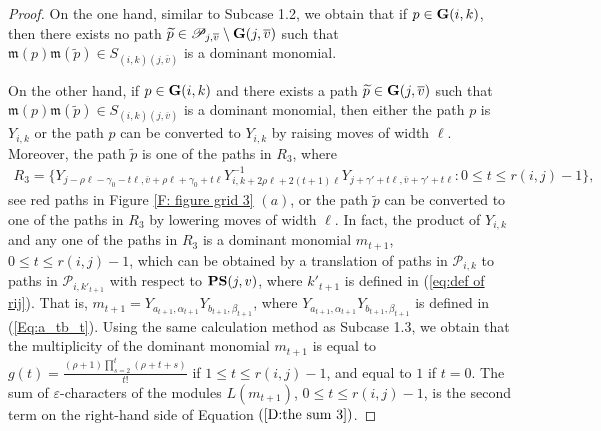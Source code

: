 \documentclass[12pt, reqno]{amsart}
\numberwithin{equation}{section}
\begin{document}
{\begin{proof}
On the one hand, similar to Subcase 1.2, we obtain that if $p \in {\bf G}(i,k)$, then there exists no path $\widetilde{p}\in \mathscr{P}_{j, \overline{v}}\setminus{\bf G}(j,\overline{v})$ such that $\mathfrak{m}(p)\mathfrak{m}(\widetilde{p}) \in S_{(i, k)(j, \overline{v})}$ is a dominant monomial.

On the other hand, if $p \in {\bf G}(i,k)$ and there exists a path $\widetilde{p}\in {\bf G}(j,\overline{v})$ such that $\mathfrak{m}(p)\mathfrak{m}(\widetilde{p})\in S_{(i, k)(j, \overline{v})}$ is a dominant monomial, then either the path $p$ is $Y_{i,k}$ or the path $p$ can be converted to $Y_{i,k}$ by raising moves of width $\ell$. Moreover, the path $\widetilde{p}$ is one of the paths in $R_3$, where
\begin{align*}
R_3=\{Y_{j-\rho \ell-\gamma_0-t \ell,\overline{v}+\rho \ell+\gamma_0+t \ell}Y_{i,k+2\rho \ell+2(t+1) \ell}^{-1}Y_{j+\gamma'+t \ell,\overline{v}+\gamma'+t \ell}: 0\leq t\leq r(i,j)-1\},
\end{align*}
see red paths in Figure \ref{F: figure grid 3} $(a)$, or the path $\widetilde{p}$ can be converted to one of the paths in $R_3$ by lowering moves of width $\ell$. In fact, the product of $Y_{i,k}$ and any one of the paths in $R_3$ is a dominant monomial $m_{t+1}$, $0\leq t\leq r(i,j)-1$, which can be obtained by a translation of paths in $\mathscr{P}_{i,k}$ to paths in $\mathscr{P}_{i,k'_{t+1}}$ with respect to ${\bf PS}(j,v)$, where $k'_{t+1}$ is defined in (\ref{eq:def of rij}). That is, $m_{t+1}=Y_{a_{t+1},\alpha_{t+1}}Y_{b_{t+1},\beta_{t+1}}$, where $Y_{a_{t+1},\alpha_{t+1}}Y_{b_{t+1},\beta_{t+1}}$ is defined in (\ref{Eq:a_tb_t}). Using the same calculation method as Subcase 1.3, we obtain that the multiplicity of the dominant monomial $m_{t+1}$ is equal to $g(t) = \frac{ (\rho+1)\prod_{s=2}^t (\rho+t+s)}{t!}$ if $1\leq t\leq r(i,j)-1$, and equal to $1$ if $t=0$. The sum of $\varepsilon$-characters of the modules $L(m_{t+1})$, $0\leq t\leq r(i,j)-1$, is the second term on the right-hand side of Equation $(\ref{D:the sum 3})$.


\end{proof}}
\end{document}
